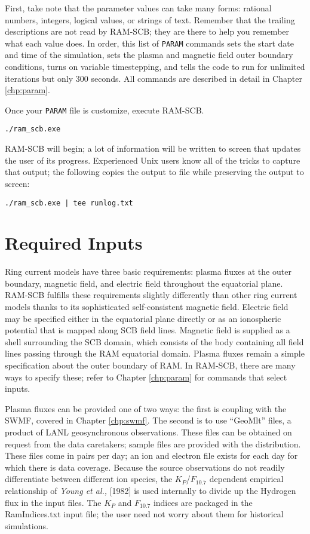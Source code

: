 First, take note that the parameter values can take many forms: rational numbers, integers, logical values, or strings of text. Remember that the trailing descriptions are not read by RAM-SCB; they are there to help you remember what each value does. In order, this list of {\tt PARAM} commands sets the start date and time of the simulation, sets the plasma and magnetic field outer boundary conditions, turns on variable timestepping, and tells the code to run for unlimited iterations but only 300 seconds. All commands are described in detail in Chapter \ref{chp:param}.

Once your {\tt PARAM} file is customize, execute RAM-SCB.

\begin{verbatim}
./ram_scb.exe
\end{verbatim}

RAM-SCB will begin; a lot of information will be written to screen that updates the user of its progress. Experienced Unix users know all of the tricks to capture that output; the following copies the output to file while preserving the output to screen:

\begin{verbatim}
./ram_scb.exe | tee runlog.txt
\end{verbatim}


\section{Required Inputs \label{subchap:input}}

Ring current models have three basic requirements: plasma fluxes at the outer boundary, magnetic field, and electric field throughout the equatorial plane. RAM-SCB fulfills these requirements slightly differently than other ring current models thanks to its sophisticated self-consistent magnetic field. Electric field may be specified either in the equatorial plane directly or as an ionospheric potential that is mapped along SCB field lines. Magnetic field is supplied as a shell surrounding the SCB domain, which consists of the body containing all field lines passing through the RAM equatorial domain. Plasma fluxes remain a simple specification about the outer boundary of RAM. In RAM-SCB, there are many ways to specify these; refer to Chapter \ref{chp:param} for commands that select inputs.

Plasma fluxes can be provided one of two ways: the first is coupling with the SWMF, covered in Chapter \ref{chp:swmf}. The second is to use ``GeoMlt'' files, a product of LANL geosynchronous observations. These files can be obtained on request from the data caretakers; sample files are provided with the distribution. These files come in pairs per day; an ion and electron file exists for each day for which there is data coverage. Because the source observations do not readily differentiate between different ion species, the $K_{P}$/$F_{10.7}$ dependent empirical relationship of \textit{Young et al.,} [1982] is used internally to divide up the Hydrogen flux in the input files. The $K_{P}$ and $F_{10.7}$ indices are packaged in the RamIndices.txt input file; the user need not worry about them for historical simulations.

